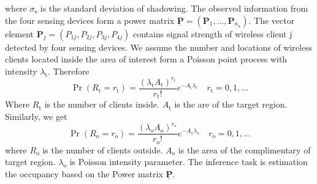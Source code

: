 where $\sigma_{\mathrm{s}}$ is the standard deviation of shadowing.
The observed information from the four sensing devices form a power matrix $\underline{\mathbf{P}} = (\mathbf{P}_1, \ldots, \mathbf{P}_{n_{\mathrm{a}}})$. The vector element $\mathbf{P}_j = (P_{1j}, P_{2j},P_{3j},P_{4j})$ contains signal strength of wireless client j detected by four sensing devices.
We assume the number and locations of wireless clients located inside the area of interest form a Poisson point process with intensity $\lambda_{\mathrm{t}}$. Therefore
\begin{equation*}
\Pr ( R_{\mathrm{t}} = r_{\mathrm{t}} )
= \frac{(\lambda_{\mathrm{t}} A_{\mathrm{t}})^{r_{\mathrm{t}}}}
{r_{\mathrm{t}}!} e^{- A_{\mathrm{t}} \lambda_{\mathrm{t}}}
\quad r_{\mathrm{t}} = 0, 1, \ldots
\end{equation*}
Where $R_{\mathrm{t}}$ is the number of clients inside. $A_{\mathrm{t}}$ is the are of the target region.
Similarly, we get
\begin{equation*}
\Pr ( R_{\mathrm{o}} = r_{\mathrm{o}} )
= \frac{(\lambda_{\mathrm{o}} A_{\mathrm{o}})^{r_{\mathrm{o}}}}
{r_{\mathrm{o}}!} e^{- A_{\mathrm{o}} \lambda_{\mathrm{o}}}
\quad r_{\mathrm{o}} = 0, 1, \ldots
\end{equation*}
where $R_{\mathrm{o}}$ is the number of clients outside. $A_{\mathrm{o}}$ is the area of the complimentary of target region. $\lambda_{\mathrm{o}}$ is Poisson intensity parameter. The inference task is estimation the occupancy based on the Power matrix $\underline{\mathbf{P}}$.
